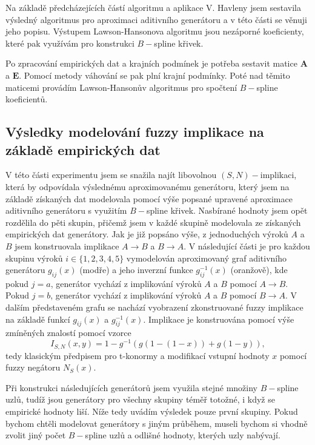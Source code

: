 
Na základě předcházejících částí algoritmu a aplikace V. Havleny jsem sestavila výsledný algoritmus pro aproximaci aditivního generátoru a v této části se věnuji jeho popisu. Výstupem Lawson-Hansonova algoritmu jsou nezáporné koeficienty, které pak využívám pro konstrukci $B-$spline křivek.

Po zpracování empirických dat a krajních podmínek je potřeba sestavit matice $\mathbf{A}$ a $\mathbf{E}$. Pomocí metody váhování se pak plní krajní podmínky. Poté nad těmito maticemi provádím Lawson-Hanson\r uv algoritmus pro spočtení $B-$spline koeficient\r u. 


\subsection{Výsledky  modelování fuzzy implikace na základě empirických dat}

V této části experimentu jsem se snažila najít libovolnou $(S,N)-$implikaci, která by odpovídala výslednému aproximovanému generátoru, který jsem na základě získaných dat modelovala pomocí výše popsané upravené aproximace aditivního generátoru s využitím $B-$spline křivek. Nasbírané hodnoty jsem opět rozdělila do pěti skupin, přičemž jsem v každé skupině modelovala ze získaných empirických dat generátory. Jak je již popsáno výše, z jednoduchých výrok\r u $A$ a $B$ jsem konstruovala implikace $A \to B$ a $B \to A$. V následující části je pro každou skupinu výrok\r u $i \in \{1, 2, 3, 4, 5\}$ vymodelován aproximovaný graf aditivního generátoru $g_{ij}(x)$ (modře) a jeho inverzní funkce $g_{ij}^{-1}(x)$ (oranžově), kde pokud $j = a$, generátor vychází z implikování výrok\r u $A$ a $B$ pomocí $A \to B$. Pokud $j = b$, generátor vychází z implikování výrok\r u $A$ a $B$ pomocí $B \to A$. V dalším představeném grafu se nachází vyobrazení zkonstruované fuzzy implikace na základě funkcí $g_{ij}(x)$ a $g_{ij}^{-1}(x)$. Implikace je konstruována pomocí výše zmíněných znalostí pomocí vzorce $$I_{S,N}(x,y) = 1-g^{-1}(g(1-(1-x))+g(1-y)),$$ tedy klasickým předpisem pro t-konormy a modifikací vstupní hodnoty $x$ pomocí fuzzy negátoru $N_S(x).$

Při konstrukci následujících generátor\r u jsem využila stejné množiny $B-$spline uzl\r u, tudíž jsou generátory pro všechny skupiny téměř totožné, i když se empirické hodnoty liší. Níže tedy uvádím výsledek pouze první skupiny. Pokud bychom chtěli modelovat generátory s jiným pr\r uběhem, museli bychom si vhodně zvolit jiný počet $B-$spline uzl\r u a odlišné hodnoty, kterých uzly nabývají.

